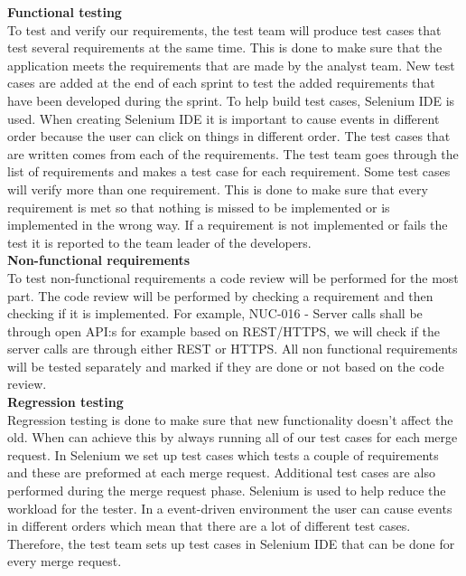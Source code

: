 \noindent\textbf{Functional testing}\\
To test and verify our requirements, the test team will produce test cases that test several requirements at the same time. This is done to make sure that the application meets the requirements that are made by the analyst team. New test cases are added at the end of each sprint to test the added requirements that have been developed during the sprint. To help build test cases, Selenium IDE is used. When creating Selenium IDE it is important to cause events in different order because the user can click on things in different order. The test cases that are written comes from each of the requirements. The test team goes through the list of requirements and makes a test case for each requirement. Some test cases will verify more than one requirement. This is done to make sure that every requirement is met so that nothing is missed to be implemented or is implemented in the wrong way. If a requirement is not implemented or fails the test it is reported to the team leader of the developers.  \\

\noindent\textbf{Non-functional requirements}\\
To test non-functional requirements a code review will be performed for the most part. The code review will be performed by checking a requirement and then checking if it is implemented. For example, NUC-016 - Server calls shall be through open API:s for example based on REST/HTTPS, we will check if the server calls are through either REST or HTTPS. All non functional requirements will be tested separately and marked if they are done or not based on the code review.\\

\noindent \textbf{Regression testing}\\
Regression testing is done to make sure that new functionality doesn't affect the old. When can achieve this by always running all of our test cases for each merge request. In Selenium we set up test cases which tests a couple of requirements and these are preformed at each merge request. Additional test cases are also performed during the merge request phase. Selenium is used to help reduce the workload for the tester. In a event-driven environment the user can cause events in different orders which mean that there are a lot of different test cases. Therefore, the test team sets up test cases in Selenium IDE that can be done for every merge request.\\


